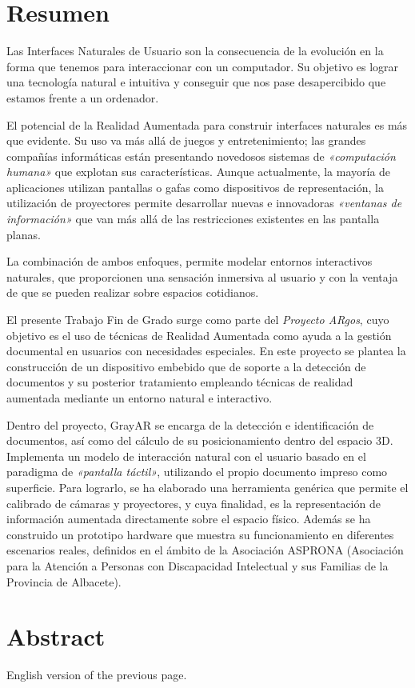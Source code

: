 \chapter{Resumen}

Las Interfaces Naturales de Usuario son la consecuencia de la evolución en la forma que tenemos para interaccionar con un computador. Su objetivo es lograr una tecnología natural e intuitiva y conseguir que nos pase desapercibido que estamos frente a un ordenador.

El potencial de la Realidad Aumentada para construir interfaces naturales es más que evidente. Su uso va más allá de juegos y entretenimiento; las grandes compañías informáticas están presentando novedosos sistemas de \textit{«computación humana»} que explotan sus características. Aunque actualmente, la mayoría de aplicaciones utilizan pantallas o gafas como dispositivos de representación, la utilización de proyectores permite desarrollar nuevas e innovadoras \textit{«ventanas de información»} que van más allá de las restricciones existentes en las pantalla planas.

La combinación de ambos enfoques, permite modelar entornos interactivos naturales, que proporcionen una sensación inmersiva al usuario y con la ventaja de que se pueden realizar sobre espacios cotidianos.

El presente Trabajo Fin de Grado surge como parte del \textit{Proyecto ARgos}, cuyo objetivo es el uso de técnicas de Realidad Aumentada como ayuda a la gestión documental en usuarios con necesidades especiales. En este proyecto se plantea la construcción de un dispositivo embebido que de soporte a la detección de documentos y su posterior tratamiento empleando técnicas de realidad aumentada mediante un entorno natural e interactivo.

Dentro del proyecto, GrayAR se encarga de la detección e identificación de documentos, así como del cálculo de su posicionamiento dentro del espacio 3D. Implementa un modelo de interacción natural con el usuario basado en el paradigma de \textit{«pantalla táctil»}, utilizando el propio documento impreso como superficie. Para lograrlo, se ha elaborado una herramienta genérica que permite el calibrado de cámaras y proyectores, y cuya finalidad, es la representación de información aumentada directamente sobre el espacio físico. Además se ha construido un prototipo hardware que muestra su funcionamiento en diferentes escenarios reales, definidos en el ámbito de la Asociación ASPRONA (Asociación para la Atención a Personas con Discapacidad Intelectual y sus Familias de la Provincia de Albacete).

\chapter{Abstract}

English version of the previous page.
